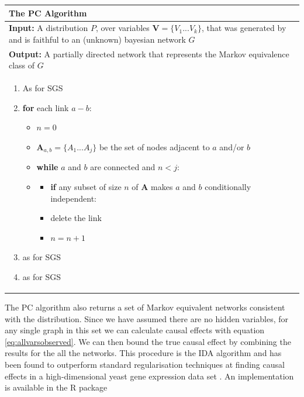 \documentclass[11pt,a4paper,oneside]{book}
\theoremstyle{plain}
\theoremstyle{definition}
\begin{document}
\begin{table}[H]
 \begin{tabularx}{\textwidth}{X}
 \hline
\rule{0pt}{2.5ex} 
 \textbf{The PC Algorithm}\\
 \hline
 \rule{0pt}{2.5ex}
\textbf{Input:} A distribution $P$, over variables $\boldsymbol{V} = \{V_{1}...V_{k}\}$, that was generated by and is faithful to an (unknown) bayesian network $G$\\
\textbf{Output:} A partially directed network that represents the Markov equivalence class of $G$\\
 \begin{enumerate}[itemsep=8pt]
  \item As for SGS
  \item \textbf{for} each link $a-b$:
  \begin{itemize}[label={}]
   \item $n = 0$
   \item $\boldsymbol{A}_{a,b} = \{A_{1}...A_{j}\}$ be the set of nodes adjacent to $a$ and/or $b$
   \item \textbf{while} $a$ and $b$ are connected and $n < j$:
   \item 
    	\begin{itemize}[label={}]
    	\item \textbf{if} any subset of size $n$ of $\boldsymbol{A}$ makes $a$ and $b$ conditionally independent:
    	\item \begin{itemize}[label={}]
    			delete the link
    		  \end{itemize}
    	
    	\item $n = n+1$
    	\end{itemize}
  \end{itemize}   
  \item as for SGS
  \item as for SGS
\end{enumerate}\\
 \hline
\end{tabularx}
\end{table}

The PC algorithm also returns a set of Markov equivalent networks consistent with the distribution. Since we have assumed there are no hidden variables, for any single graph in this set we can calculate causal effects with equation \ref{eq:allvarsobserved}. We can then bound the true causal effect by combining the results for the all the networks. This procedure is the IDA algorithm \cite{Maathuis2009} and has been found to outperform standard regularisation techniques at finding causal effects in a high-dimensional yeast gene expression data set \cite{Maathuis2010}. An implementation is available in the R package \cite{Kalisch2012} 
\end{document}
